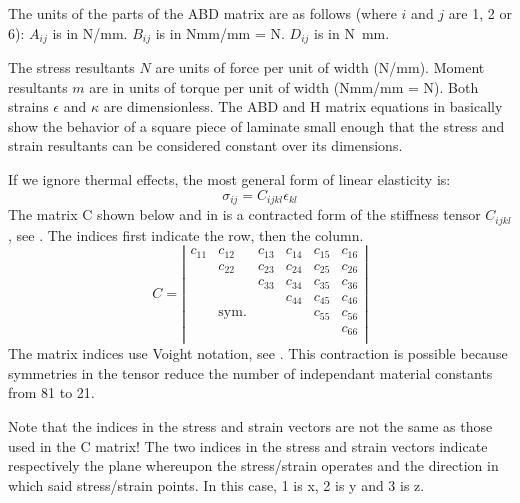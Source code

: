 \documentclass[a4paper,landscape,oneside,11pt,twocolumn]{memoir}
\begin{document}
The units of the parts of the ABD matrix are as follows (where $i$ and
$j$ are 1, 2 or 6): $A_{ij}$ is in \si{N/mm}. $B_{ij}$ is in \si{Nmm/mm}
= \si{N}.  $D_{ij}$ is in \si{N.mm}.

The stress resultants $N$ are units of force per unit of width (\si{N/mm}).
Moment resultants $m$ are in units of torque per unit of width (\si{Nmm/mm}
= \si{N}). Both strains $\epsilon$ and $\kappa$ are dimensionless.
The ABD and H matrix equations in  basically show the
behavior of a square piece of laminate small enough that the stress and strain
resultants can be considered constant over its dimensions.

If we ignore thermal effects, the most general form of linear elasticity is:
\[
    \sigma_{ij} = C_{ijkl}\epsilon_{kl}
\]
The matrix C shown below and in  is a contracted form of
the stiffness tensor $C_{ijkl}$, see \citet[p. 78]{Bower:2010}.
The indices first indicate the row, then the column.
\[
    C = \left|\begin{array}{cccccc}
        c_{11} & c_{12} & c_{13} & c_{14} & c_{15} & c_{16}\\
               & c_{22} & c_{23} & c_{24} & c_{25} & c_{26}\\
               &        & c_{33} & c_{34} & c_{35} & c_{36}\\
               &        &        & c_{44} & c_{45} & c_{46}\\
               &  \mathrm{sym.}  &        &        & c_{55} & c_{56}\\
               &        &        &        &        & c_{66}\\
    \end{array}\right|
\]
The matrix indices use Voight notation, see \citet[p. 310]{Barbero:2008}.
This contraction is possible because symmetries in the tensor reduce the
number of independant material constants from 81 to 21.

Note that the indices in the stress and strain vectors are not the same as
those used in the C matrix!
The two indices in the stress and strain vectors indicate respectively the
plane whereupon the stress/strain operates and the direction in which said
stress/strain points.
In this case, 1 is x, 2 is y and 3 is z.
\end{document}

